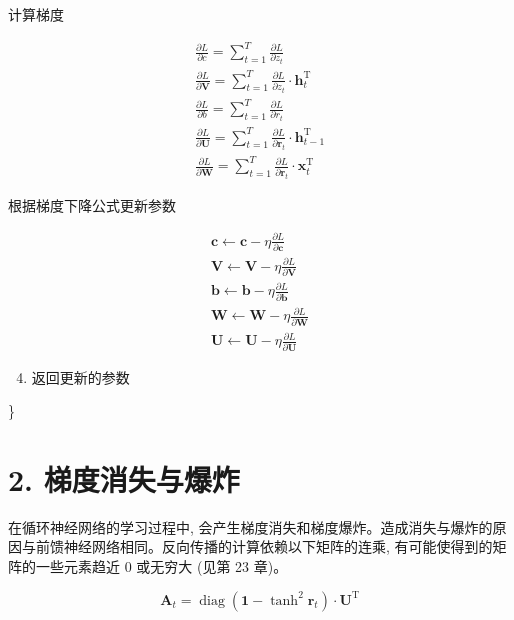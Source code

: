 \documentclass[10pt]{article}
\begin{document}
计算梯度

$$
\begin{gathered}
\frac{\partial L}{\partial c}=\sum_{t=1}^{T} \frac{\partial L}{\partial z_{t}} \\
\frac{\partial L}{\partial \boldsymbol{V}}=\sum_{t=1}^{T} \frac{\partial L}{\partial z_{t}} \cdot \boldsymbol{h}_{t}^{\mathrm{T}} \\
\frac{\partial L}{\partial b}=\sum_{t=1}^{T} \frac{\partial L}{\partial r_{t}} \\
\frac{\partial L}{\partial \boldsymbol{U}}=\sum_{t=1}^{T} \frac{\partial L}{\partial \boldsymbol{r}_{t}} \cdot \boldsymbol{h}_{t-1}^{\mathrm{T}} \\
\frac{\partial L}{\partial \boldsymbol{W}}=\sum_{t=1}^{T} \frac{\partial L}{\partial \boldsymbol{r}_{t}} \cdot \boldsymbol{x}_{t}^{\mathrm{T}}
\end{gathered}
$$

根据梯度下降公式更新参数

$$
\begin{gathered}
\boldsymbol{c} \leftarrow \boldsymbol{c}-\eta \frac{\partial L}{\partial \boldsymbol{c}} \\
\boldsymbol{V} \leftarrow \boldsymbol{V}-\eta \frac{\partial L}{\partial \boldsymbol{V}} \\
\boldsymbol{b} \leftarrow \boldsymbol{b}-\eta \frac{\partial L}{\partial \boldsymbol{b}} \\
\boldsymbol{W} \leftarrow \boldsymbol{W}-\eta \frac{\partial L}{\partial \boldsymbol{W}} \\
\boldsymbol{U} \leftarrow \boldsymbol{U}-\eta \frac{\partial L}{\partial \boldsymbol{U}}
\end{gathered}
$$

\begin{enumerate}
  \setcounter{enumi}{3}
  \item 返回更新的参数
\end{enumerate}

\}

\section*{2. 梯度消失与爆炸}
在循环神经网络的学习过程中, 会产生梯度消失和梯度爆炸。造成消失与爆炸的原因与前馈神经网络相同。反向传播的计算依赖以下矩阵的连乘, 有可能使得到的矩阵的一些元素趋近 0 或无穷大 (见第 23 章)。

$$
\boldsymbol{A}_{t}=\operatorname{diag}\left(\mathbf{1}-\tanh ^{2} \boldsymbol{r}_{t}\right) \cdot \boldsymbol{U}^{\mathrm{T}}
$$
\end{document}
